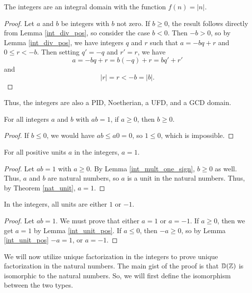 \documentclass[../../math.tex]{subfiles}
\begin{document}
\begin{instance}
    The integers are an integral domain with the function $f(n) = |n|$.
\end{instance}
\begin{proof}
    Let $a$ and $b$ be integers with $b$ not zero.  If $b \geq 0$, the result
    follows directly from Lemma \ref{int_div_pos}, so consider the case $b < 0$.
    Then $-b > 0$, so by Lemma \ref{int_div_pos}, we have integers $q$ and $r$
    such that $a = -bq + r$ and $0 \leq r < -b$.  Then setting $q' = -q$ and $r'
    = r$, we have
    \[
        a = -bq + r = b(-q) + r = bq' + r'
    \]
    and
    \[
        |r| = r < -b = |b|.
    \]
\end{proof}

Thus, the integers are also a PID, Noetherian, a UFD, and a GCD domain.

\begin{lemma} \label{int_mult_one_sign}
    For all integers $a$ and $b$ with $ab = 1$, if $a \geq 0$, then $b \geq 0$.
\end{lemma}
\begin{proof}
    If $b \leq 0$, we would have $ab \leq a0 = 0$, so $1 \leq 0$, which is
    impossible.
\end{proof}

\begin{lemma} \label{int_unit_pos}
    For all positive units $a$ in the integers, $a = 1$.
\end{lemma}
\begin{proof}
    Let $ab = 1$ with $a \geq 0$.  By Lemma \ref{int_mult_one_sign}, $b \geq 0$
    as well.  Thus, $a$ and $b$ are natural numbers, so $a$ is a unit in the
    natural numbers.  Thus, by Theorem \ref{nat_unit}, $a = 1$.
\end{proof}

\begin{theorem} \label{int_unit}
    In the integers, all units are either $1$ or $-1$.
\end{theorem}
\begin{proof}
    Let $ab = 1$.  We must prove that either $a = 1$ or $a = -1$.  If $a \geq
    0$, then we get $a = 1$ by Lemma \ref{int_unit_pos}.  If $a \leq 0$, then
    $-a \geq 0$, so by Lemma \ref{int_unit_pos} $-a = 1$, or $a = -1$.
\end{proof}

We will now utilize unique factorization in the integers to prove unique
factorization in the natural numbers.  The main gist of the proof is that
$\mathbb{D}(\mathbb{Z})$ is isomorphic to the natural numbers.  So, we will first define the
isomorphism between the two types.
\end{document}

